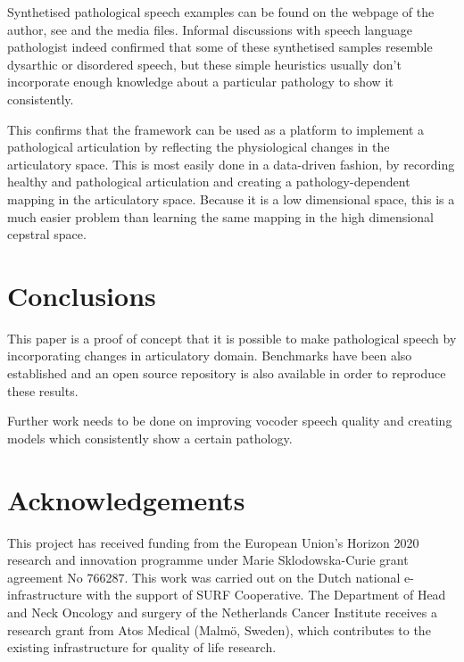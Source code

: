 \documentclass[a4paper]{article}
\begin{document}
Synthetised pathological speech examples can be found on the webpage of the
author, see \cite{Speech2019} and the media files.
Informal discussions with speech language pathologist indeed confirmed
that some of these synthetised samples resemble dysarthic or disordered speech,
but these simple heuristics usually don't incorporate enough knowledge
about a particular pathology to show it consistently.

This confirms that the framework can be used as a platform to implement a
pathological articulation by reflecting the physiological changes in the articulatory
space. This is most easily done in a data-driven fashion, by recording healthy
and pathological articulation and creating a pathology-dependent mapping
in the articulatory space. Because it is a low dimensional space, this
is a much easier problem than learning the same mapping in the high dimensional cepstral space.

\section{Conclusions}

This paper is a proof of concept that it is possible to make pathological
speech by incorporating changes in articulatory domain. Benchmarks
have been also established and an open source repository is also available
in order to reproduce these results. 

Further work needs to be done on improving
vocoder speech quality and creating models which consistently show a certain
pathology.

\section{Acknowledgements}
This project has received funding from the European Union's Horizon
2020 research and innovation programme under Marie Sklodowska-Curie
grant agreement No 766287.
This work was carried out on the Dutch national e-infrastructure with the support of SURF Cooperative.
The Department of Head and Neck Oncology and surgery of the Netherlands
Cancer Institute receives a research grant from Atos Medical (Malmö,
Sweden), which contributes to the existing infrastructure for quality of
life research.




\end{document}
